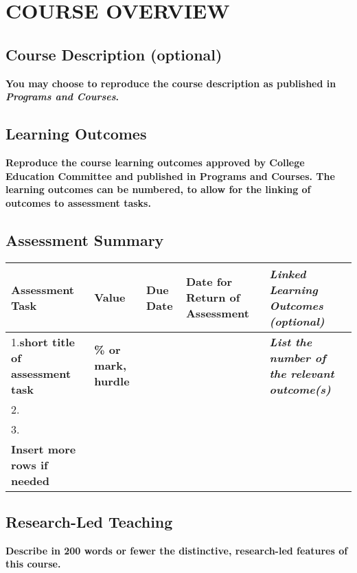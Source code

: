 \documentclass[11pt]{article}
\begin{document}
\newpage

\section*{COURSE OVERVIEW}

\subsection*{Course Description (optional)}
\textbf{{\color{red}You may choose to reproduce the course description as published in \textit{Programs and Courses}.}}

\subsection*{Learning Outcomes}
\textbf{{\color{red}Reproduce the course learning outcomes approved by College Education Committee and published in Programs and Courses. The learning outcomes can be numbered, to allow for the linking of outcomes to assessment tasks.}}

\subsection*{Assessment Summary}
\begin{tabular}{| p{2.8cm} | p{2.5cm} | p{2cm} | p{4cm} | p{4cm} |}
	\hline
	\textbf{Assessment Task} & \textbf{Value} & \textbf{Due Date} & \textbf{Date for Return of \newline Assessment} & \textbf{\textit{Linked Learning \newline Outcomes (optional)}} \\ \hline
	1.\textbf{{\color{red}short title of assessment task}} & \textbf{{\color{red}\% or mark, \newline hurdle}} & & & \textbf{\textit{{\color{red}List the number of the relevant outcome(s)}}} \\ \hline
	2. & & & & \\ \hline
	3. & & & & \\ \hline
	\textbf{{\color{red}Insert more rows if needed}} & & & & \\ \hline
\end{tabular}

\subsection*{Research-Led Teaching}
{\bfseries\color{red}Describe in 200 words or fewer the distinctive, research-led features of this course.}
\end{document}
